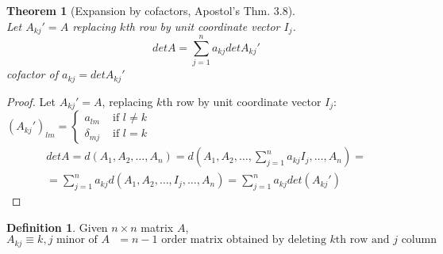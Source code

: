 \documentclass[twoside]{amsart}
\theoremstyle{plain}
\newtheorem{theorem}{Theorem}
\theoremstyle{definition}
\newtheorem{definition}{Definition}
\begin{document}
\begin{theorem}[Expansion by cofactors, Apostol's Thm. 3.8] \quad \\
  Let $A_{kj}' = A$ replacing $k$th row by unit coordinate vector $I_j$.  
\begin{equation}
  det{A} = \sum_{j=1}^n a_{kj} det{A_{kj}'}
\end{equation}
cofactor of $a_{kj} = det{A_{kj}'}$
\end{theorem}

\begin{proof}
Let $A_{kj}' = A$, replacing $k$th row by unit coordinate vector $I_j$: $(A_{kj}')_{lm} = \begin{cases} a_{lm} & \text{ if } l \neq k \\ \delta_{mj} & \text{ if } l = k \end{cases} $ 
\[
\begin{gathered}
  det{A} = d(A_1, A_2,\dots, A_n) = d(A_1, A_2, \dots, \sum_{j=1}^n a_{kj} I_j, \dots, A_n) = \\
  = \sum_{j=1}^n a_{kj} d(A_1, A_2, \dots, I_j, \dots, A_n) = \sum_{j=1}^n a_{kj} det{(A_{kj}')}
\end{gathered}
\]
\end{proof}

\begin{definition} Given $n\times n$ matrix $A$, 
\[
A_{kj} \equiv k,j \text{ minor of $A$ } = n-1 \text{ order matrix obtained by deleting $k$th row and $j$ column }
\]
\end{definition}
\end{document}
